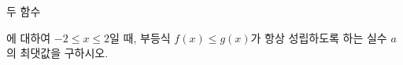 두 함수\par\smallskip{}\par\smallskip\noindent 에 대하여 $-2\le x\le 2$일 때, 부등식 $f(x)\le g(x)$가 항상 성립하도록 하는 실수 $a$의 최댓값을 구하시오.
